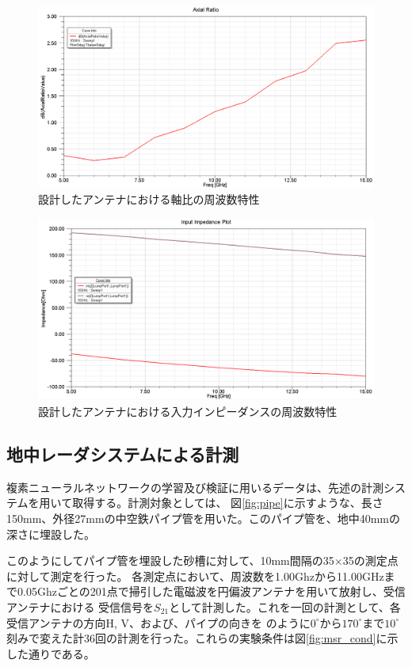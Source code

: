 \documentclass[11pt,a4paper,uplatex]{ujarticle}
\begin{document}
  \begin{figure}[hbtp]
    \centering
    \includegraphics[keepaspectratio, width=130mm]{Images/axial_ratio.png}
    \caption{設計したアンテナにおける軸比の周波数特性}
    \label{fig:axial_ratio}
  \end{figure}

  \begin{figure}[hbtp]
    \centering
    \includegraphics[keepaspectratio, width=130mm]{Images/spiral_impedance.png}
    \caption{設計したアンテナにおける入力インピーダンスの周波数特性}
    \label{fig:spiral_antenna_impedance}
  \end{figure}

\newpage

  \subsection{地中レーダシステムによる計測}
  複素ニューラルネットワークの学習及び検証に用いるデータは、先述の計測システムを用いて取得する。計測対象としては、
  図\ref{fig:pipe}に示すような、長さ150mm、外径27mmの中空鉄パイプ管を用いた。このパイプ管を、地中40mmの深さに埋設した。

  このようにしてパイプ管を埋設した砂槽に対して、10mm間隔の35×35の測定点に対して測定を行った。
  各測定点において、周波数を1.00Ghzから11.00GHzまで0.05Ghzごとの201点で掃引した電磁波を円偏波アンテナを用いて放射し、受信アンテナにおける
  受信信号を$S_{21}$として計測した。これを一回の計測として、各受信アンテナの方向H, V、および、パイプの向きを
  のように$0^{\circ}$から$170^{\circ}$まで$10^{\circ}$刻みで変えた計36回の計測を行った。これらの実験条件は図\ref{fig:msr_cond}に示した通りである。
\end{document}
